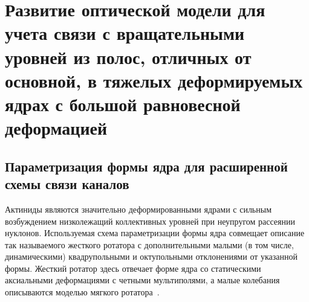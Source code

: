 \chapter{Развитие оптической модели для учета связи с вращательными 
уровней из полос, отличных от основной, в тяжелых деформируемых ядрах
с большой равновесной деформацией}



\section{Параметризация формы ядра для расширенной схемы связи каналов%
\label{sec:nuclear_shape}}

Актиниды являются значительно деформированными ядрами с сильным возбуждением низколежащий коллективных уровней при неупругом рассеянии нуклонов. Используемая схема параметризации формы ядра совмещает описание так называемого жесткого ротатора с дополнительными малыми (в том числе, динамическими) квадрупольными и октупольными отклонениями от указанной формы. Жесткий ротатор здесь отвечает форме ядра со статическими аксиальными деформациями с четными мультиполями, а малые колебания описываются моделью мягкого ротатора~\cite{SRM1,SRM2}. 

